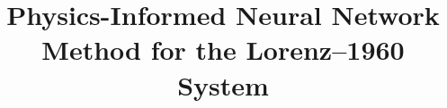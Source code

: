\documentclass[conference]{IEEEtran}
\begin{document}
\title{Physics-Informed Neural Network Method for the Lorenz--1960 System}
\author{}
\maketitle

\begin{abstract}

\end{abstract}

\begin{IEEEkeywords}

\end{IEEEkeywords}

\setcounter{section}{2}
\end{document}
